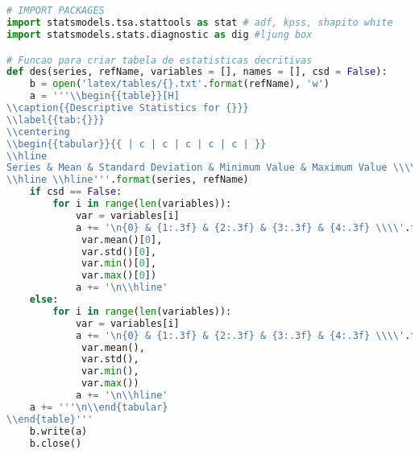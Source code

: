 \begin{lstlisting}[language=Python]


# IMPORT PACKAGES
import statsmodels.tsa.stattools as stat # adf, kpss, shapito white
import statsmodels.stats.diagnostic as dig #ljung box

# Funcao para criar tabela de estatisticas decritivas
def des(series, refName, variables = [], names = [], csd = False):
    b = open('latex/tables/{}.txt'.format(refName), 'w')
    a = '''\\begin{{table}}[H]
\\caption{{Descriptive Statistics for {}}}
\\label{{tab:{}}}
\\centering
\\begin{{tabular}}{{ | c | c | c | c | c | }}
\\hline
Series & Mean & Standard Deviation & Minimum Value & Maximum Value \\\\
\\hline \\hline'''.format(series, refName)
    if csd == False:
        for i in range(len(variables)):
            var = variables[i]
            a += '\n{0} & {1:.3f} & {2:.3f} & {3:.3f} & {4:.3f} \\\\'.format(names[i],
             var.mean()[0],
             var.std()[0],
             var.min()[0],
             var.max()[0])
            a += '\n\\hline'
    else:
        for i in range(len(variables)):
            var = variables[i]
            a += '\n{0} & {1:.3f} & {2:.3f} & {3:.3f} & {4:.3f} \\\\'.format(names[i],
             var.mean(),
             var.std(),
             var.min(),
             var.max())
            a += '\n\\hline'
    a += '''\n\\end{tabular}
\\end{table}'''
    b.write(a)
    b.close()


\end{lstlisting}
